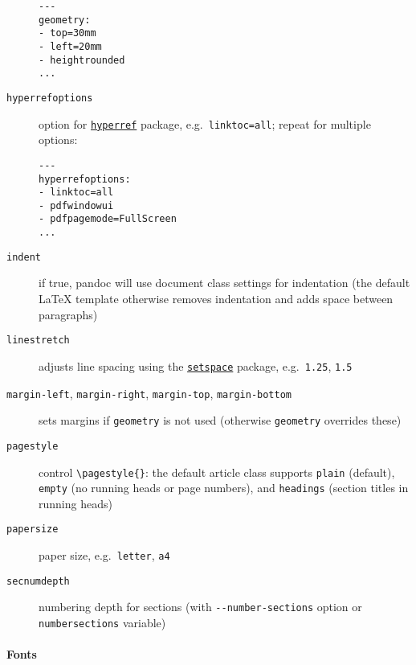 \documentclass[]{article}
\begin{document}
\begin{description}
\begin{verbatim}
---
geometry:
- top=30mm
- left=20mm
- heightrounded
...
\end{verbatim}
\item[\texttt{hyperrefoptions}]
option for \href{https://ctan.org/pkg/hyperref}{\texttt{hyperref}}
package, e.g.~\texttt{linktoc=all}; repeat for multiple options:

\begin{verbatim}
---
hyperrefoptions:
- linktoc=all
- pdfwindowui
- pdfpagemode=FullScreen
...
\end{verbatim}
\item[\texttt{indent}]
if true, pandoc will use document class settings for indentation (the
default LaTeX template otherwise removes indentation and adds space
between paragraphs)
\item[\texttt{linestretch}]
adjusts line spacing using the
\href{https://ctan.org/pkg/setspace}{\texttt{setspace}} package,
e.g.~\texttt{1.25}, \texttt{1.5}
\item[\texttt{margin-left}, \texttt{margin-right}, \texttt{margin-top},
\texttt{margin-bottom}]
sets margins if \texttt{geometry} is not used (otherwise
\texttt{geometry} overrides these)
\item[\texttt{pagestyle}]
control \texttt{\textbackslash{}pagestyle\{\}}: the default article
class supports \texttt{plain} (default), \texttt{empty} (no running
heads or page numbers), and \texttt{headings} (section titles in running
heads)
\item[\texttt{papersize}]
paper size, e.g.~\texttt{letter}, \texttt{a4}
\item[\texttt{secnumdepth}]
numbering depth for sections (with \texttt{-\/-number-sections} option
or \texttt{numbersections} variable)
\end{description}

\hypertarget{fonts}{%
\paragraph{Fonts}\label{fonts}}
\end{document}
